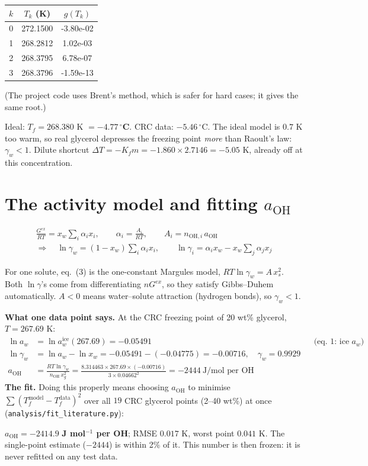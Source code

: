 \documentclass[11pt,a4paper]{article}
\newcommand{\aoh}{a_{\mathrm{OH}}}
\newcommand{\file}[1]{\texttt{\small #1}}
\newcommand{\aice}{\ln a_w^{\mathrm{ice}}}
\begin{document}
\begin{center}\small
\begin{tabular}{c c c}
\toprule
$k$ & $T_k$ (K) & $g(T_k)$\\
\midrule
0 & 272.1500 & -3.80e-02\\
1 & 268.2812 & 1.02e-03\\
2 & 268.3795 & 6.78e-07\\
3 & 268.3796 & -1.59e-13\\
\bottomrule
\end{tabular}
\end{center}
(The project code uses Brent's method, which is safer for hard cases; it gives the same root.)
\begin{result}
Ideal: $T_f=268.380$ K $=\mathbf{-4.77\,^\circ}$\textbf{C}. CRC data: $-5.46\,^\circ$C. The ideal model is
$0.7$ K too warm, so real glycerol depresses the freezing point \emph{more} than Raoult's law: $\gamma_w<1$.
Dilute shortcut $\Delta T=-K_f m=-1.860\times2.7146=-5.05$ K, already off at this concentration.
\end{result}

\section{The activity model and fitting $\aoh$}
\begin{eqbox}
\begin{gather*}
\frac{G^{ex}}{RT}=x_w\sum_i\alpha_i x_i,\qquad \alpha_i=\frac{A_i}{RT},\qquad A_i=n_{\mathrm{OH},i}\,\aoh\\
\Rightarrow\quad \ln\gamma_w=(1-x_w)\sum_i\alpha_i x_i,\qquad \ln\gamma_i=\alpha_i x_w-x_w\sum_j\alpha_jx_j \tag{3}
\end{gather*}
\end{eqbox}
For one solute, eq.~(3) is the one-constant Margules model, $RT\ln\gamma_w=A\,x_s^2$. Both $\ln\gamma$'s come from
differentiating $nG^{ex}$, so they satisfy Gibbs--Duhem automatically. $A<0$ means water--solute attraction (hydrogen bonds), so $\gamma_w<1$.

\textbf{What one data point says.} At the CRC freezing point of 20 wt\% glycerol, $T=267.69$ K:
\begin{align*}
\ln a_w &= \aice(267.69)=-0.05491 &&\text{(eq.~1: ice fixes $a_w$)}\\
\ln\gamma_w &= \ln a_w-\ln x_w=-0.05491-(-0.04775)=-0.00716,\quad \gamma_w=0.9929\\
\aoh &= \frac{RT\ln\gamma_w}{n_\mathrm{OH}\,x_g^2}=\frac{8.314463\times267.69\times(-0.00716)}{3\times0.04662^2}=-2444\ \text{J/mol per OH}
\end{align*}
\textbf{The fit.} Doing this properly means choosing $\aoh$ to minimise $\sum(T_f^{\text{model}}-T_f^{\text{data}})^2$ over all
$19$ CRC glycerol points (2--40 wt\%) at once (\file{analysis/fit\_literature.py}):
\begin{result}
$\aoh=\mathbf{-2414.9}$ \textbf{J mol$^{-1}$ per OH}; RMSE $0.017$ K, worst point $0.041$ K. The single-point
estimate ($-2444$) is within 2\% of it. This number is then frozen: it is never refitted on any test data.
\end{result}
\end{document}
